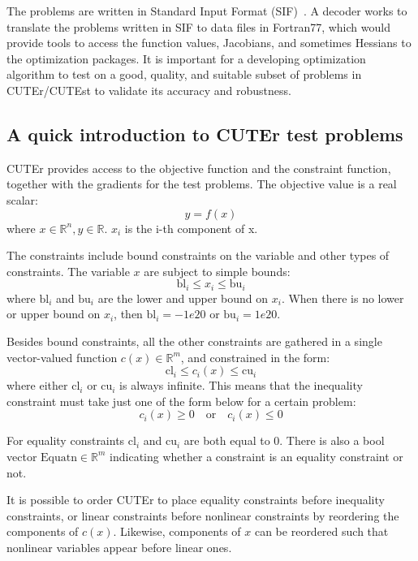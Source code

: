 The problems are written in Standard Input Format (SIF)~\cite{Conn1992}. A decoder works to translate the problems written in SIF to data files in Fortran77, which would provide tools to access the function values, Jacobians, and sometimes Hessians to the optimization packages. It is important for a developing optimization algorithm to test on a good, quality, and suitable subset of problems in CUTEr/CUTEst to validate its accuracy and robustness. 

\subsection{A quick introduction to CUTEr test problems}\label{sec:cuternm}
CUTEr provides access to the objective function and the constraint function, together with the gradients for the test problems. The objective value is a real scalar: 
\begin{equation*}
y = f(x) 
\end{equation*}
where  $x \in \mathbb{R}^n, y \in \mathbb{R}$. $x_i$ is the i-th component of x. 

The constraints include bound constraints on the variable and other types of constraints. The variable $x$ are subject to simple bounds:
\begin{equation*}
\text{bl}_i \leq x_i \leq \text{bu}_i  
\end{equation*}
where $\text{bl}_i$ and $\text{bu}_i$ are the lower and upper bound on $x_i$. When there is no lower or upper bound on $x_i$, then $\text{bl}_i = -1e20$ or $\text{bu}_i = 1e20$. 

Besides bound constraints, all the other constraints are gathered in a single vector-valued function $c(x) \in \mathbb{R}^m$, and constrained in the form:    
\begin{equation*}
\text{cl}_i \leq c_i(x) \leq \text{cu}_i  
\end{equation*}
where either $\text{cl}_i$ or $\text{cu}_i$ is always infinite. This means that the inequality constraint must take just one of the form below for a certain problem:
\begin{equation*}
c_i(x) \geq 0   \quad  \text{or}  \quad  c_i(x) \leq 0
\end{equation*}

For equality constraints $\text{cl}_i$ and $\text{cu}_i$ are both equal to 0. There is also a bool vector $\text{Equatn} \in \mathbb{R}^m$ indicating whether a constraint is an equality constraint or not. 

It is possible to order CUTEr to place equality constraints before inequality constraints, or linear constraints before nonlinear constraints by reordering the components of $c(x)$. Likewise, components of $x$ can be reordered such that nonlinear variables appear before linear ones. 

